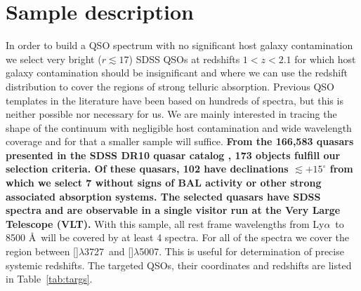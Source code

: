 \documentclass{aa}    %
\newcommand{\Tab}[1]{Table~\ref{tab:#1}}
\newcommand{\tab}[1]{\Tab{#1}}
\newcommand{\sectlabel}[1]{\label{sect:#1}}
\newcommand{\lya}{Ly$\alpha$}
\newcommand{\oii}{[\ion{O}{ii}]$\lambda$3727}
\newcommand{\oiii}{[\ion{O}{iii}]$\lambda$5007}
\begin{document}
\section{Sample description}   \sectlabel{sample}

In order to build a QSO spectrum with no significant host galaxy
contamination we select very bright ($r \lesssim 17$) SDSS QSOs at
redshifts $1 < z < 2.1$ for which host galaxy contamination should be
insignificant and where we can use the redshift distribution to cover
the regions of strong telluric absorption. Previous QSO templates in
the literature have been based on hundreds of spectra, but this is
neither possible nor necessary for us. We are mainly interested in
tracing the shape of the continuum with negligible host contamination
and wide wavelength coverage and for that a smaller sample will
suffice. \textbf{From the 166,583 quasars presented in the SDSS DR10 quasar catalog \citep{Paris2014}, 173 objects fulfill our selection criteria. Of these quasars, 102 have declinations $\lesssim +15^\circ$ from which we select 7 without signs of BAL activity or other strong associated absorption systems. The selected quasars have SDSS spectra and are observable in a single visitor run at the Very Large Telescope (VLT).} With this sample, all rest frame
wavelengths from \lya~to 8500 \AA~will be covered by at least 4
spectra. For all of the spectra we cover the region between \oii~and
\oiii. This is useful for determination of precise systemic
redshifts. The targeted QSOs, their coordinates and redshifts are
listed in \tab{targs}.
\end{document}
